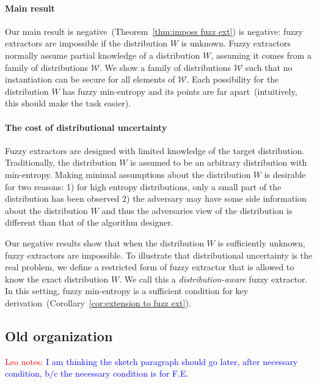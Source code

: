 \documentclass[11pt]{article}
\newcommand{\thref}[1]{\mbox{Theorem~\ref{#1}}}
\newcommand{\corref}[1]{\mbox{Corollary~\ref{#1}}}
\newcommand{\authnote}[2]{{\textcolor{red}{\textsf{#1 notes: }\textcolor{blue}{ #2}}\marginpar{\textcolor{red}{\textbf{!!!!!}}}}}
\newcommand{\authnote}[2]{}
\newcommand{\lnote}[1]{{\authnote{Leo}{#1}}}
\begin{document}
\paragraph{Main result}
Our main result is negative~(\thref{thm:imposs fuzz ext}) is negative: fuzzy extractors are impossible if the distribution $W$ is unknown.   Fuzzy extractors normally assume partial knowledge of a distribution $W$, assuming it comes from a family of distributions $\mathcal{W}$.  We show a family of distributions $\mathcal{W}$ such that no instantiation can be secure for all elements of $\mathcal{W}$.  Each possibility for the distribution $W$ has fuzzy min-entropy and its points are far apart~(intuitively, this should make the task easier).

\paragraph{The cost of distributional uncertainty}
Fuzzy extractors are designed with limited knowledge of the target distribution.  Traditionally, the distribution $W$ is assumed to be an arbitrary distribution with min-entropy.  Making minimal assumptions about the distribution $W$ is desirable for two reasons: 1) for high entropy distributions, only a small part of the distribution has been observed 2) the adversary may have some side information about the distribution $W$ and thus the adversaries view of the distribution is different than that of the algorithm designer.  

Our negative results show that when the distribution $W$ is sufficiently unknown, fuzzy extractors are impossible.  To illustrate that distributional uncertainty is the real problem, we define a restricted form of fuzzy extractor that is allowed to know the exact distribution $W$.  We call this a \emph{distribution-aware} fuzzy extractor.  In this setting, fuzzy min-entropy is a sufficient condition for key derivation~(\corref{cor:extension to fuzz ext}).



\subsection{Old organization}

\lnote{I am thinking the sketch paragraph should go later, after necessary condition, b/c the necessary condition is for F.E.}
\end{document}
